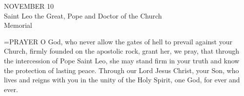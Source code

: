 \begin{center}\normalsize NOVEMBER 10\\
\footnotesize Saint Leo the Great, Pope and Doctor of the Church\\
\footnotesize Memorial\\
\end{center}

\hangindent=\parindent \small{PRAYER 
O God, who never allow the gates of hell
to prevail against your Church,
firmly founded on the apostolic rock,
grant her, we pray,
that through the intercession of Pope Saint Leo,
she may stand firm in your truth
and know the protection of lasting peace.
Through our Lord Jesus Christ, your Son,
who lives and reigns with you in the unity of the Holy Spirit,
one God, for ever and ever.\\}
 
